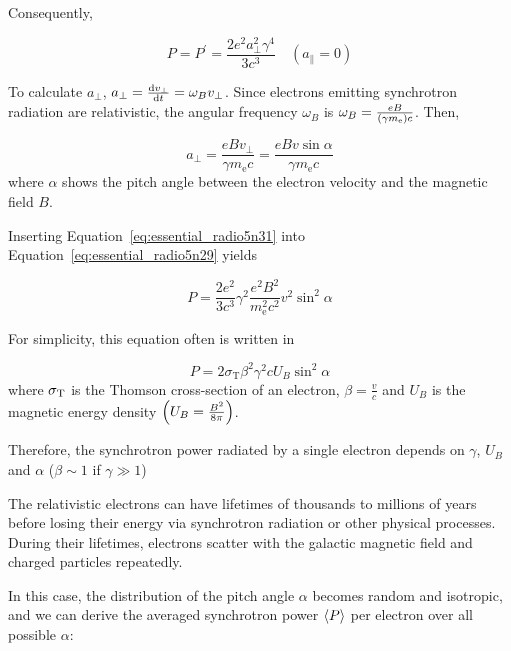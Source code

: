 Consequently,

\begin{equation}\label{eq:essential_radio5n29}
    P=P^{\prime}=\frac{2 e^{2} a_{\perp}^{2} \gamma^{4}}{3 c^{3}} \quad\left(a_{\|}=0\right)
\end{equation}

To calculate $a_{\perp}$, $a_{\perp} = \frac{\mathrm{d} v_{\perp}}{\mathrm{d} t} = \omega_B v_{\perp}$.
Since electrons emitting synchrotron radiation are relativistic, the angular frequency $\omega_{B}$ is $\omega_B = \frac{eB}{\left(\gamma m_{\mathrm{e}}\right)c}$.
Then,

\begin{equation}\label{eq:essential_radio5n31}
    a_{\perp}=\frac{e B v_{\perp}}{\gamma m_{\mathrm{e}} c}=\frac{e B v \sin \alpha}{\gamma m_{\mathrm{e}} c}
\end{equation}
where $\alpha$ shows the pitch angle between the electron velocity and the magnetic field $B$.

Inserting Equation~\ref{eq:essential_radio5n31} into Equation~\ref{eq:essential_radio5n29} yields

\begin{equation}\label{eq:essential_radio5n32}
    P=\frac{2 e^{2}}{3 c^{3}} \gamma^{2} \frac{e^{2} B^{2}}{m_{\mathrm{e}}^{2} c^{2}} v^{2} \sin ^{2} \alpha
\end{equation}

For simplicity, this equation often is written in

\begin{equation}\label{eq:essential_radio5n37}
    P=2 \sigma_{\mathrm{T}} \beta^{2} \gamma^{2} c U_{B} \sin ^{2} \alpha
\end{equation}
where $\sigma_{\mathrm{T}}$ is the Thomson cross-section of an electron, $\beta=\frac{v}{c}$ and $U_B$ is the magnetic energy density $\left(U_B = \frac{B^2}{8\pi}\right)$.

Therefore, the synchrotron power radiated by a single electron depends on $\gamma$, $U_B$ and $\alpha$ ($\beta\sim1$ if $\gamma \gg 1$)

The relativistic electrons can have lifetimes of thousands to millions of years before losing their energy via synchrotron radiation or other physical processes.
During their lifetimes, electrons scatter with the galactic magnetic field and charged particles repeatedly.

In this case, the distribution of the pitch angle $\alpha$ becomes random and isotropic, and we can derive the averaged synchrotron power $\left\langle P\right\rangle$ per electron over all possible $\alpha$:


